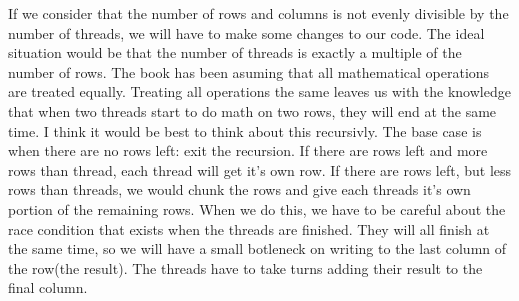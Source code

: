 \documentclass{article}
\begin{document}
If we consider that the number of rows and columns is not evenly divisible by the number of threads, we will
have to make some changes to our code.
The ideal situation would be that the number of threads is exactly a multiple of the number of rows.
The book has been asuming that all mathematical operations are treated equally. Treating all operations the
same leaves us with the knowledge that when two threads start to do math on two rows, they will end at the 
same time. I think it would be best to think about this recursivly. The base case is when there are no rows left: 
exit the recursion. If there are rows left and more rows than thread, each thread will get it's own row.
If there are rows left, but less rows than threads, we would chunk the rows and give each threads it's
own portion of the remaining rows. When we do this, we have to be careful about the race condition that 
exists when the threads are finished. They will all finish at the same time, so we will have a small 
botleneck on writing to the last column of the row(the result). The threads have to take turns adding 
their result to the final column. 

\lstset{language=C,
	xleftmargin=1pt,
        framextopmargin=6pt,
        framexbottommargin=6pt, 
        frame=tb, framerule=0pt,}
\end{document}
